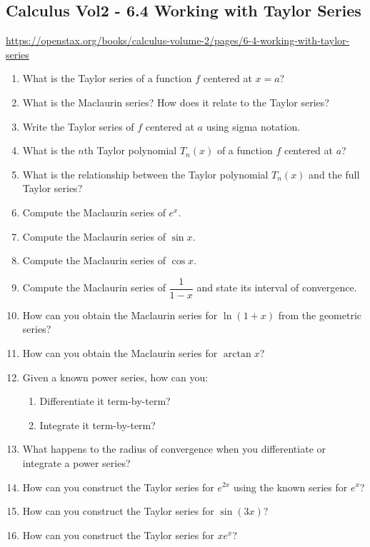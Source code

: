 \subsection{Calculus Vol2 - 6.4 Working with Taylor Series}

\url{https://openstax.org/books/calculus-volume-2/pages/6-4-working-with-taylor-series}

\begin{enumerate}
  \item What is the Taylor series of a function \(f\) centered at \(x=a\)?
  \item What is the Maclaurin series? How does it relate to the Taylor series?
  \item Write the Taylor series of \(f\) centered at \(a\) using sigma notation.
  \item What is the \(n\)th Taylor polynomial \(T_{n}(x)\) of a function \(f\) centered at \(a\)?
  \item What is the relationship between the Taylor polynomial \(T_{n}(x)\) and the full Taylor series?
  \item Compute the Maclaurin series of \(e^{x}\).
  \item Compute the Maclaurin series of \(\sin x\).
  \item Compute the Maclaurin series of \(\cos x\).
  \item Compute the Maclaurin series of \(\dfrac{1}{1-x}\) and state its interval of convergence.
  \item How can you obtain the Maclaurin series for \(\ln(1+x)\) from the geometric series?
  \item How can you obtain the Maclaurin series for \(\arctan x\)?
  \item Given a known power series, how can you:
    \begin{enumerate}
      \item Differentiate it term-by-term?
      \item Integrate it term-by-term?
    \end{enumerate}
  \item What happens to the radius of convergence when you differentiate or integrate a power series?
  \item How can you construct the Taylor series for \(e^{2x}\) using the known series for \(e^{x}\)?
  \item How can you construct the Taylor series for \(\sin(3x)\)?
  \item How can you construct the Taylor series for \(x e^{x}\)?

\end{enumerate}
